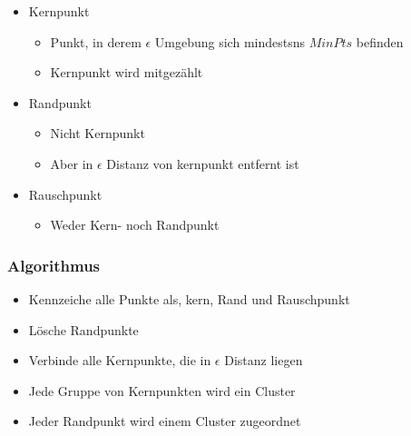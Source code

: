 \documentclass[a4paper]{article}
\begin{document}
\begin{landscape}
\begin{multicols}{3}
    \begin{itemize}[noitemsep,nolistsep]
        \item Kernpunkt
            \begin{itemize}[noitemsep,nolistsep]
                \item Punkt, in derem $\epsilon$ Umgebung sich mindestsns $MinPts$ befinden
                \item Kernpunkt wird mitgezählt
            \end{itemize}
        \item Randpunkt
            \begin{itemize}[noitemsep,nolistsep]
                \item Nicht Kernpunkt
                \item Aber in $\epsilon$ Distanz von kernpunkt entfernt ist
            \end{itemize}
        \item Rauschpunkt
            \begin{itemize}[noitemsep,nolistsep]
                \item Weder Kern- noch Randpunkt
            \end{itemize}
    \end{itemize}

    \subsubsection{Algorithmus}
    \begin{itemize}[noitemsep,nolistsep]
        \item Kennzeiche alle Punkte als, kern, Rand und Rauschpunkt
        \item Lösche Randpunkte
        \item Verbinde alle Kernpunkte, die in $\epsilon$ Distanz liegen
        \item Jede Gruppe von Kernpunkten wird ein Cluster
        \item Jeder Randpunkt wird einem Cluster zugeordnet
    \end{itemize}


\end{multicols}
\end{landscape}
\end{document}

